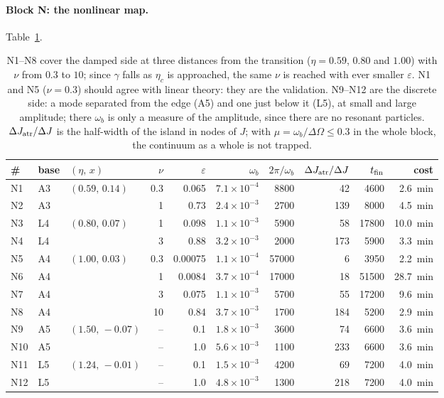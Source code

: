 \documentclass[11pt,a4paper]{article}
\begin{document}
\paragraph{Block N: the nonlinear map.} Table~\ref{tab:mapa}.

\begin{table}[!htbp]
\centering
\small
\setlength{\tabcolsep}{4pt}
\begin{tabular}{lllrrrrrrr}
\toprule
\# & base & $(\eta,\,x)$ & $\nu$ & $\varepsilon$ & $\omega_b$ & $2\pi/\omega_b$ &
  $\Delta J_{\rm atr}/\Delta J$ & $t_{\rm fin}$ & cost\\
\midrule
N1 & A3 & $(0.59,\,0.14)$ & 0.3 & 0.065 & $7.1\times10^{-4}$ & 8800 & 42 & 4600 & \SI{2.6}{min}\\
N2 & A3 & & 1 & 0.73 & $2.4\times10^{-3}$ & 2700 & 139 & 8000 & \SI{4.5}{min}\\
N3 & L4 & $(0.80,\,0.07)$ & 1 & 0.098 & $1.1\times10^{-3}$ & 5900 & 58 & 17800 & \SI{10.0}{min}\\
N4 & L4 & & 3 & 0.88 & $3.2\times10^{-3}$ & 2000 & 173 & 5900 & \SI{3.3}{min}\\
N5 & A4 & $(1.00,\,0.03)$ & 0.3 & 0.00075 & $1.1\times10^{-4}$ & 57000 & 6 & 3950 & \SI{2.2}{min}\\
N6 & A4 & & 1 & 0.0084 & $3.7\times10^{-4}$ & 17000 & 18 & 51500 & \SI{28.7}{min}\\
N7 & A4 & & 3 & 0.075 & $1.1\times10^{-3}$ & 5700 & 55 & 17200 & \SI{9.6}{min}\\
N8 & A4 & & 10 & 0.84 & $3.7\times10^{-3}$ & 1700 & 184 & 5200 & \SI{2.9}{min}\\
\midrule
N9 & A5 & $(1.50,\,-0.07)$ & -- & 0.1 & $1.8\times10^{-3}$ & 3600 & 74 & 6600 & \SI{3.6}{min}\\
N10 & A5 & & -- & 1.0 & $5.6\times10^{-3}$ & 1100 & 233 & 6600 & \SI{3.6}{min}\\
N11 & L5 & $(1.24,\,-0.01)$ & -- & 0.1 & $1.5\times10^{-3}$ & 4200 & 69 & 7200 & \SI{4.0}{min}\\
N12 & L5 & & -- & 1.0 & $4.8\times10^{-3}$ & 1300 & 218 & 7200 & \SI{4.0}{min}\\
\bottomrule
\end{tabular}
\caption{N1--N8 cover the damped side at three distances from the transition ($\eta=0.59$,
$0.80$ and $1.00$) with $\nu$ from $0.3$ to $10$; since $\gamma$ falls as $\eta_c$ is approached, the
same $\nu$ is reached with ever smaller $\varepsilon$. N1 and N5 ($\nu=0.3$) should agree with linear
theory: they are the validation. N9--N12 are the discrete side: a mode separated from the
edge (A5) and one just below it (L5), at small and large amplitude; there $\omega_b$ is only a
measure of the amplitude, since there are no resonant particles. $\Delta J_{\rm atr}/\Delta J$ is the
half-width of the island in nodes of $J$; with $\mu=\omega_b/\Delta\Omega\le0.3$ in the whole block, the
continuum as a whole is not trapped.}
\label{tab:mapa}
\end{table}
\end{document}
